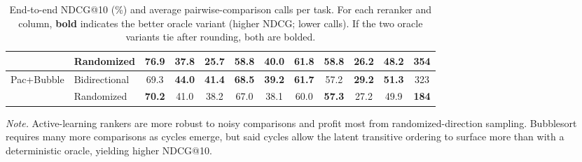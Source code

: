 \documentclass[11pt]{article}
\begin{document}
\begin{table}[H]
\begin{adjustbox}{max width=\textwidth}
\begin{tabular}{llcccccccccc}
& Randomized
& \textbf{76.9} & \textbf{37.8} & 25.7 & \textbf{58.8} & \textbf{40.0} & 61.8 & \textbf{58.8} & \textbf{26.2} & \textbf{48.2} & \textbf{354} \\
\midrule
\multirow{2}{*}{Pac+Bubble} & Bidirectional
& 69.3 & \textbf{44.0} & \textbf{41.4} & \textbf{68.5} & \textbf{39.2} & \textbf{61.7} & 57.2 & \textbf{29.2} & \textbf{51.3} & 323 \\
& Randomized
& \textbf{70.2} & 41.0 & 38.2 & 67.0 & 38.1 & 60.0 & \textbf{57.3} & 27.2 & 49.9 & \textbf{184} \\
\bottomrule
\end{tabular}
\end{adjustbox}
\caption{
End-to-end NDCG@10 (\%) and average pairwise-comparison calls per task. For each reranker and column, \textbf{bold} indicates the better oracle variant (higher NDCG; lower calls).
If the two oracle variants tie after rounding, both are bolded. %
}
\label{tab:reranker_oracle_compare}
\par\vspace{2pt}\footnotesize\noindent\textit{Note.} Active-learning rankers are more robust to noisy comparisons and profit most from randomized-direction sampling. Bubblesort requires many more comparisons as cycles emerge, but said cycles allow the latent transitive ordering to surface more than with a deterministic oracle, yielding higher NDCG@10.

\end{table}
\end{document}

